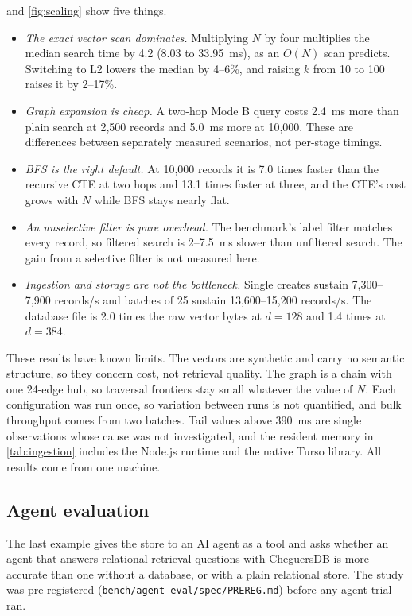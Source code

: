 \documentclass[preprint,12pt,a4paper]{elsarticle}
\begin{document}
 and \cref{fig:scaling} show five things.
\begin{itemize}
  \item \emph{The exact vector scan dominates.} Multiplying $N$ by four multiplies the median search time by 4.2 (8.03 to 33.95~ms), as an $O(N)$ scan predicts. Switching to L2 lowers the median by 4--6\%, and raising $k$ from 10 to 100 raises it by 2--17\%.
  \item \emph{Graph expansion is cheap.} A two-hop Mode B query costs 2.4~ms more than plain search at 2,500 records and 5.0~ms more at 10,000. These are differences between separately measured scenarios, not per-stage timings.
  \item \emph{BFS is the right default.} At 10,000 records it is 7.0 times faster than the recursive CTE at two hops and 13.1 times faster at three, and the CTE's cost grows with $N$ while BFS stays nearly flat.
  \item \emph{An unselective filter is pure overhead.} The benchmark's label filter matches every record, so filtered search is 2--7.5~ms slower than unfiltered search. The gain from a selective filter is not measured here.
  \item \emph{Ingestion and storage are not the bottleneck.} Single creates sustain 7,300--7,900 records/s and batches of 25 sustain 13,600--15,200 records/s. The database file is 2.0 times the raw vector bytes at $d = 128$ and 1.4 times at $d = 384$.
\end{itemize}
These results have known limits. The vectors are synthetic and carry no semantic structure, so they concern cost, not retrieval quality. The graph is a chain with one 24-edge hub, so traversal frontiers stay small whatever the value of $N$. Each configuration was run once, so variation between runs is not quantified, and bulk throughput comes from two batches. Tail values above 390~ms are single observations whose cause was not investigated, and the resident memory in \cref{tab:ingestion} includes the Node.js runtime and the native Turso library. All results come from one machine.

\subsection{Agent evaluation}
\label{sec:agent}

The last example gives the store to an AI agent as a tool and asks whether an agent that answers relational retrieval questions with CheguersDB is more accurate than one without a database, or with a plain relational store. The study was pre-registered (\nolinkurl{bench/agent-eval/spec/PREREG.md}) before any agent trial ran.
\end{document}
